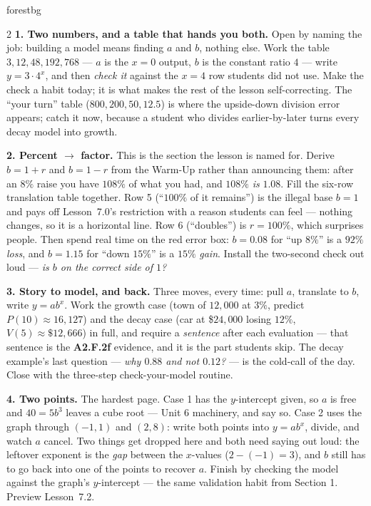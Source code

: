 \documentclass[10pt]{article}
\begin{document}
\begin{skillbox}[Lesson]{forestbg}
\begin{multicols}{2}
\textbf{1. Two numbers, and a table that hands you both.} Open by naming the job: building a model
means finding $a$ and $b$, nothing else. Work the table $3,12,48,192,768$ --- $a$ is the $x=0$
output, $b$ is the constant ratio $4$ --- write $y=3\cdot4^{x}$, and then \emph{check it} against
the $x=4$ row students did not use. Make the check a habit today; it is what makes the rest of the
lesson self-correcting. The ``your turn'' table ($800,200,50,12.5$) is where the upside-down
division error appears; catch it now, because a student who divides earlier-by-later turns every
decay model into growth.

\textbf{2. Percent $\to$ factor.} This is the section the lesson is named for. Derive $b=1+r$ and
$b=1-r$ from the Warm-Up rather than announcing them: after an $8\%$ raise you have $108\%$ of what
you had, and $108\%$ \emph{is} $1.08$. Fill the six-row translation table together. Row 5 (``$100\%$
of it remains'') is the illegal base $b=1$ and pays off Lesson~7.0's restriction with a reason
students can feel --- nothing changes, so it is a horizontal line. Row 6 (``doubles'') is $r=100\%$,
which surprises people. Then spend real time on the red error box: $b=0.08$ for ``up $8\%$'' is a
$92\%$ \emph{loss}, and $b=1.15$ for ``down $15\%$'' is a $15\%$ \emph{gain}. Install the two-second
check out loud --- \emph{is $b$ on the correct side of $1$?}

\columnbreak

\textbf{3. Story to model, and back.} Three moves, every time: pull $a$, translate to $b$, write
$y=ab^{x}$. Work the growth case (town of $12{,}000$ at $3\%$, predict $P(10)\approx16{,}127$) and
the decay case (car at \$$24{,}000$ losing $12\%$, $V(5)\approx\$12{,}666$) in full, and require a
\emph{sentence} after each evaluation --- that sentence is the \textbf{A2.F.2f} evidence, and it is
the part students skip. The decay example's last question --- \emph{why $0.88$ and not $0.12$?} ---
is the cold-call of the day. Close with the three-step check-your-model routine.

\textbf{4. Two points.} The hardest page. Case 1 has the $y$-intercept given, so $a$ is free and
$40=5b^{3}$ leaves a cube root --- Unit 6 machinery, and say so. Case 2 uses the graph through
$(-1,1)$ and $(2,8)$: write both points into $y=ab^{x}$, divide, and watch $a$ cancel. Two things
get dropped here and both need saying out loud: the leftover exponent is the \emph{gap} between the
$x$-values ($2-(-1)=3$), and $b$ still has to go back into one of the points to recover $a$. Finish
by checking the model against the graph's $y$-intercept --- the same validation habit from
Section 1. Preview Lesson~7.2.
\end{multicols}
\end{skillbox}
\end{document}
